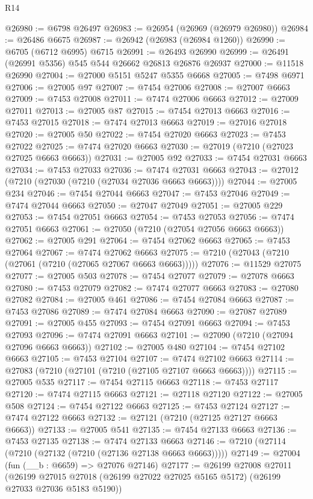 \begin{lexlean}{R14}
\begin{coremodule}
@26980 := @6798 @26497
@26983 := @26954 (@26969 (@26979 @26980))
@26984 := @26486 @6675
@26987 := @26942 (@26983 (@26984 @1260))
@26990 := @6705 (@6712 @6995) @6715
@26991 := @26493 @26990
@26999 := @26491 (@26991 @5356) @545 @544 @26662 @26813 @26876 @26937
@27000 := @11518 @26990
@27004 := @27000 @5151 @5247 @5355 @6668
@27005 := @7498 @6971
@27006 := @27005 @97
@27007 := @7454 @27006
@27008 := @27007 @6663
@27009 := @7453 @27008
@27011 := @7474 @27006 @6663
@27012 := @27009 @27011
@27013 := @27005 @87
@27015 := @7454 @27013 @6663
@27016 := @7453 @27015
@27018 := @7474 @27013 @6663
@27019 := @27016 @27018
@27020 := @27005 @50
@27022 := @7454 @27020 @6663
@27023 := @7453 @27022
@27025 := @7474 @27020 @6663
@27030 := @27019 (@7210 (@27023 @27025 @6663 @6663))
@27031 := @27005 @92
@27033 := @7454 @27031 @6663
@27034 := @7453 @27033
@27036 := @7474 @27031 @6663
@27043 := @27012 (@7210 (@27030 (@7210 (@27034 @27036 @6663 @6663))))
@27044 := @27005 @234
@27046 := @7454 @27044 @6663
@27047 := @7453 @27046
@27049 := @7474 @27044 @6663
@27050 := @27047 @27049
@27051 := @27005 @229
@27053 := @7454 @27051 @6663
@27054 := @7453 @27053
@27056 := @7474 @27051 @6663
@27061 := @27050 (@7210 (@27054 @27056 @6663 @6663))
@27062 := @27005 @291
@27064 := @7454 @27062 @6663
@27065 := @7453 @27064
@27067 := @7474 @27062 @6663
@27075 := @7210 (@27043 (@7210 (@27061 (@7210 (@27065 @27067 @6663 @6663)))))
@27076 := @11529 @27075
@27077 := @27005 @503
@27078 := @7454 @27077
@27079 := @27078 @6663
@27080 := @7453 @27079
@27082 := @7474 @27077 @6663
@27083 := @27080 @27082
@27084 := @27005 @461
@27086 := @7454 @27084 @6663
@27087 := @7453 @27086
@27089 := @7474 @27084 @6663
@27090 := @27087 @27089
@27091 := @27005 @455
@27093 := @7454 @27091 @6663
@27094 := @7453 @27093
@27096 := @7474 @27091 @6663
@27101 := @27090 (@7210 (@27094 @27096 @6663 @6663))
@27102 := @27005 @480
@27104 := @7454 @27102 @6663
@27105 := @7453 @27104
@27107 := @7474 @27102 @6663
@27114 := @27083 (@7210 (@27101 (@7210 (@27105 @27107 @6663 @6663))))
@27115 := @27005 @535
@27117 := @7454 @27115 @6663
@27118 := @7453 @27117
@27120 := @7474 @27115 @6663
@27121 := @27118 @27120
@27122 := @27005 @508
@27124 := @7454 @27122 @6663
@27125 := @7453 @27124
@27127 := @7474 @27122 @6663
@27132 := @27121 (@7210 (@27125 @27127 @6663 @6663))
@27133 := @27005 @541
@27135 := @7454 @27133 @6663
@27136 := @7453 @27135
@27138 := @7474 @27133 @6663
@27146 := @7210 (@27114 (@7210 (@27132 (@7210 (@27136 @27138 @6663 @6663)))))
@27149 := @27004 (fun (__b : @6659) => @27076 @27146)
@27177 := @26199
    @27008
    @27011
    (@26199 @27015 @27018 (@26199 @27022 @27025 @5165 @5172) (@26199 @27033 @27036 @5183 @5190))

\end{coremodule}
\end{lexlean}
